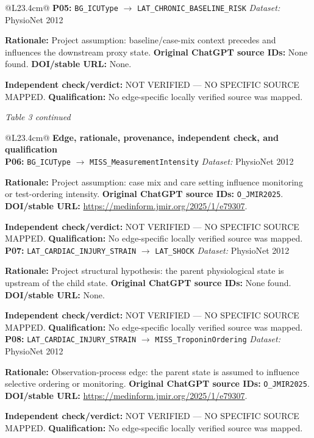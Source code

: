 \begin{tabular}{@{}L{23.4cm}@{}}
\addlinespace[2pt]
\midrule
\textbf{P05:} \nolinkurl{BG_ICUType} $\rightarrow$ \nolinkurl{LAT_CHRONIC_BASELINE_RISK} \hfill \textit{Dataset:} PhysioNet 2012\par\textbf{Rationale:} Project assumption: baseline/case-mix context precedes and influences the downstream proxy state. \textbf{Original ChatGPT source IDs:} None found. \textbf{DOI/stable URL:} None.\par\textbf{Independent check/verdict:} NOT VERIFIED --- NO SPECIFIC SOURCE MAPPED. \textbf{Qualification:} No edge-specific locally verified source was mapped. \\
\addlinespace[2pt]
\midrule
\bottomrule
\end{tabular}
\clearpage
\textit{Table 3 continued}\par
\begin{tabular}{@{}L{23.4cm}@{}}
\toprule
\textbf{Edge, rationale, provenance, independent check, and qualification}\\
\midrule
\textbf{P06:} \nolinkurl{BG_ICUType} $\rightarrow$ \nolinkurl{MISS_MeasurementIntensity} \hfill \textit{Dataset:} PhysioNet 2012\par\textbf{Rationale:} Project assumption: case mix and care setting influence monitoring or test-ordering intensity. \textbf{Original ChatGPT source IDs:} \nolinkurl{O_JMIR2025}. \textbf{DOI/stable URL:} \url{https://medinform.jmir.org/2025/1/e79307}.\par\textbf{Independent check/verdict:} NOT VERIFIED --- NO SPECIFIC SOURCE MAPPED. \textbf{Qualification:} No edge-specific locally verified source was mapped. \\
\addlinespace[2pt]
\midrule
\textbf{P07:} \nolinkurl{LAT_CARDIAC_INJURY_STRAIN} $\rightarrow$ \nolinkurl{LAT_SHOCK} \hfill \textit{Dataset:} PhysioNet 2012\par\textbf{Rationale:} Project structural hypothesis: the parent physiological state is upstream of the child state. \textbf{Original ChatGPT source IDs:} None found. \textbf{DOI/stable URL:} None.\par\textbf{Independent check/verdict:} NOT VERIFIED --- NO SPECIFIC SOURCE MAPPED. \textbf{Qualification:} No edge-specific locally verified source was mapped. \\
\addlinespace[2pt]
\midrule
\textbf{P08:} \nolinkurl{LAT_CARDIAC_INJURY_STRAIN} $\rightarrow$ \nolinkurl{MISS_TroponinOrdering} \hfill \textit{Dataset:} PhysioNet 2012\par\textbf{Rationale:} Observation-process edge: the parent state is assumed to influence selective ordering or monitoring. \textbf{Original ChatGPT source IDs:} \nolinkurl{O_JMIR2025}. \textbf{DOI/stable URL:} \url{https://medinform.jmir.org/2025/1/e79307}.\par\textbf{Independent check/verdict:} NOT VERIFIED --- NO SPECIFIC SOURCE MAPPED. \textbf{Qualification:} No edge-specific locally verified source was mapped. \\

\end{tabular}
